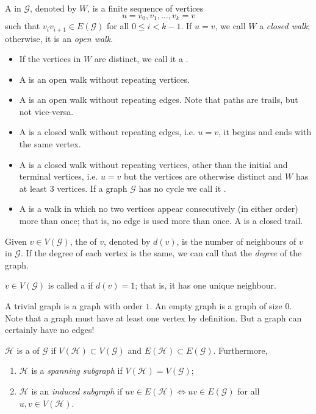 \begin{definition}[Walk]
A  in $\mathcal{G}$, denoted by $W$, is a finite sequence of vertices 
\[u=v_0,v_1,\dots,v_k=v\]
such that $v_i v_{i+1} \in E(\mathcal{G})$ for all $0 \le i < k-1$. If $u=v$, we call $W$ a \emph{closed walk}; otherwise, it is an \emph{open walk}.
\begin{itemize}
\item If the vertices in $W$ are distinct, we call it a .
\item A  is an open walk without repeating vertices.
\item A  is an open walk without repeating edges. Note that paths are trails, but not vice-versa.
\item A  is a closed walk without repeating edges, i.e. $u=v$, it begins and ends with the same vertex.
\item A  is a closed walk without repeating vertices, other than the initial and terminal vertices, i.e. $u=v$ but the vertices are otherwise distinct and $W$ has at least 3 vertices. If a graph $\mathcal{G}$ has no cycle we call it .
\item A  is a walk in which no two vertices appear consecutively (in either order) more than once; that is, no edge is used more than once. A  is a closed trail.
\end{itemize}
\end{definition}

\begin{definition}
Given $v\in V(\mathcal{G})$, the  of $v$, denoted by $d(v)$, is the number of neighbours of $v$ in $\mathcal{G}$. If the degree of each vertex is the same, we can call that the \emph{degree} of the graph.

$v\in V(\mathcal{G})$ is called a  if $d(v)=1$; that is, it has one unique neighbour.
\end{definition}

\begin{remark}
A trivial graph is a graph with order $1$. An empty graph is a graph of size $0$. Note that a graph must have at least one vertex by definition. But a graph can certainly have no edges!
\end{remark}

\begin{definition}[Subgraph]
$\mathcal{H}$ is a  of $\mathcal{G}$ if $V(\mathcal{H})\subset V(\mathcal{G})$ and $E(\mathcal{H})\subset E(\mathcal{G})$. Furthermore,
\begin{enumerate}[label=(\roman*)]
\item $\mathcal{H}$ is a \emph{spanning subgraph} if $V(\mathcal{H})=V(\mathcal{G})$;
\item $\mathcal{H}$ is an \emph{induced subgraph} if $uv\in E(\mathcal{H})\iff uv\in E(\mathcal{G})$ for all $u,v\in V(\mathcal{H})$.
\end{enumerate}
\end{definition}

